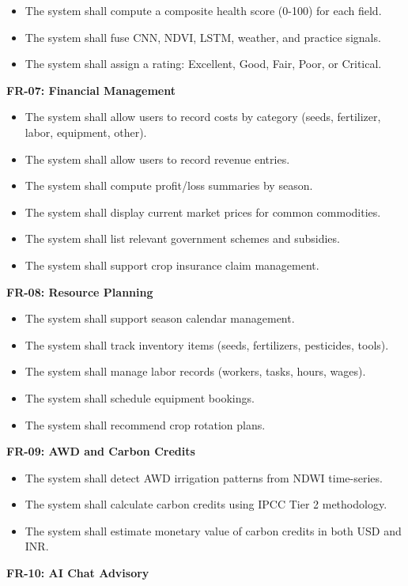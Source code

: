 \documentclass[12pt, a4paper]{report}
\begin{document}
\begin{itemize}[leftmargin=*]
  \item The system shall compute a composite health score (0-100) for each field.
  \item The system shall fuse CNN, NDVI, LSTM, weather, and practice signals.
  \item The system shall assign a rating: Excellent, Good, Fair, Poor, or Critical.
\end{itemize}
\textbf{FR-07: Financial Management}

\begin{itemize}[leftmargin=*]
  \item The system shall allow users to record costs by category (seeds, fertilizer, labor, equipment, other).
  \item The system shall allow users to record revenue entries.
  \item The system shall compute profit/loss summaries by season.
  \item The system shall display current market prices for common commodities.
  \item The system shall list relevant government schemes and subsidies.
  \item The system shall support crop insurance claim management.
\end{itemize}
\textbf{FR-08: Resource Planning}

\begin{itemize}[leftmargin=*]
  \item The system shall support season calendar management.
  \item The system shall track inventory items (seeds, fertilizers, pesticides, tools).
  \item The system shall manage labor records (workers, tasks, hours, wages).
  \item The system shall schedule equipment bookings.
  \item The system shall recommend crop rotation plans.
\end{itemize}
\textbf{FR-09: AWD and Carbon Credits}

\begin{itemize}[leftmargin=*]
  \item The system shall detect AWD irrigation patterns from NDWI time-series.
  \item The system shall calculate carbon credits using IPCC Tier 2 methodology.
  \item The system shall estimate monetary value of carbon credits in both USD and INR.
\end{itemize}
\textbf{FR-10: AI Chat Advisory}
\end{document}
